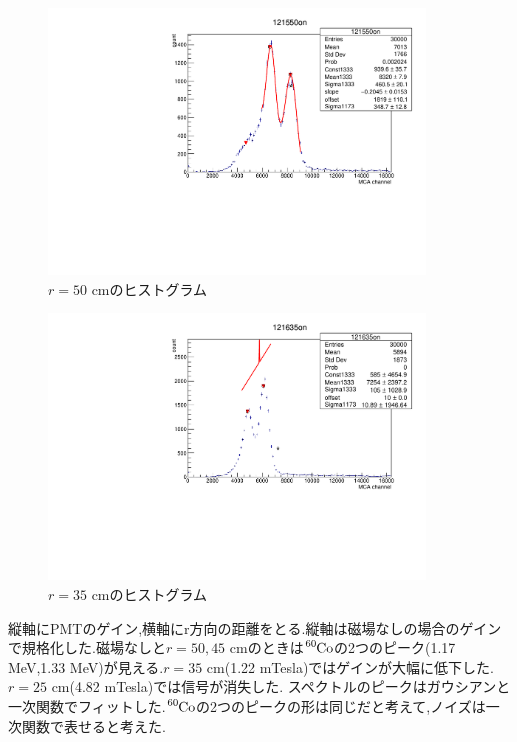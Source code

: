 \begin{figure}[H]
	\centering
		\includegraphics[angle=-90,width=10cm]{fig/iguchi/121550on.pdf}
	\caption{$r=50$ cmのヒストグラム}
	\label{hist50}
\end{figure}
\begin{figure}[H]
	\centering
		\includegraphics[angle=-90,width=10cm]{fig/iguchi/121635on.pdf}
	\caption{$r=35$ cmのヒストグラム}
	\label{hist35}
\end{figure}
縦軸にPMTのゲイン,横軸にr方向の距離をとる.縦軸は磁場なしの場合のゲインで規格化した.磁場なしと$r=50,45$ cmのときは$\ce{^{60}Co}$の2つのピーク(1.17 MeV,1.33 MeV)が見える.$r=35$ cm(1.22 mTesla)ではゲインが大幅に低下した.$r=25$ cm(4.82 mTesla)では信号が消失した.
スペクトルのピークはガウシアンと一次関数でフィットした.$\ce{^{60}Co}$の2つのピークの形は同じだと考えて,ノイズは一次関数で表せると考えた.
